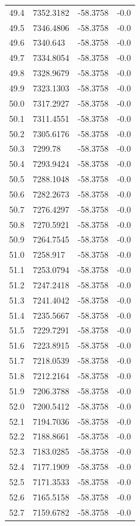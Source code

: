 \begin{table}[H]
\begin{tabular}{llll}
49.4 & 7352.3182 & -58.3758 & -0.0 \\
49.5 & 7346.4806 & -58.3758 & -0.0 \\
49.6 & 7340.643 & -58.3758 & -0.0 \\
49.7 & 7334.8054 & -58.3758 & -0.0 \\
49.8 & 7328.9679 & -58.3758 & -0.0 \\
49.9 & 7323.1303 & -58.3758 & -0.0 \\
50.0 & 7317.2927 & -58.3758 & -0.0 \\
50.1 & 7311.4551 & -58.3758 & -0.0 \\
50.2 & 7305.6176 & -58.3758 & -0.0 \\
50.3 & 7299.78 & -58.3758 & -0.0 \\
50.4 & 7293.9424 & -58.3758 & -0.0 \\
50.5 & 7288.1048 & -58.3758 & -0.0 \\
50.6 & 7282.2673 & -58.3758 & -0.0 \\
50.7 & 7276.4297 & -58.3758 & -0.0 \\
50.8 & 7270.5921 & -58.3758 & -0.0 \\
50.9 & 7264.7545 & -58.3758 & -0.0 \\
51.0 & 7258.917 & -58.3758 & -0.0 \\
51.1 & 7253.0794 & -58.3758 & -0.0 \\
51.2 & 7247.2418 & -58.3758 & -0.0 \\
51.3 & 7241.4042 & -58.3758 & -0.0 \\
51.4 & 7235.5667 & -58.3758 & -0.0 \\
51.5 & 7229.7291 & -58.3758 & -0.0 \\
51.6 & 7223.8915 & -58.3758 & -0.0 \\
51.7 & 7218.0539 & -58.3758 & -0.0 \\
51.8 & 7212.2164 & -58.3758 & -0.0 \\
51.9 & 7206.3788 & -58.3758 & -0.0 \\
52.0 & 7200.5412 & -58.3758 & -0.0 \\
52.1 & 7194.7036 & -58.3758 & -0.0 \\
52.2 & 7188.8661 & -58.3758 & -0.0 \\
52.3 & 7183.0285 & -58.3758 & -0.0 \\
52.4 & 7177.1909 & -58.3758 & -0.0 \\
52.5 & 7171.3533 & -58.3758 & -0.0 \\
52.6 & 7165.5158 & -58.3758 & -0.0 \\
52.7 & 7159.6782 & -58.3758 & -0.0 \\

\end{tabular}
\end{table}
